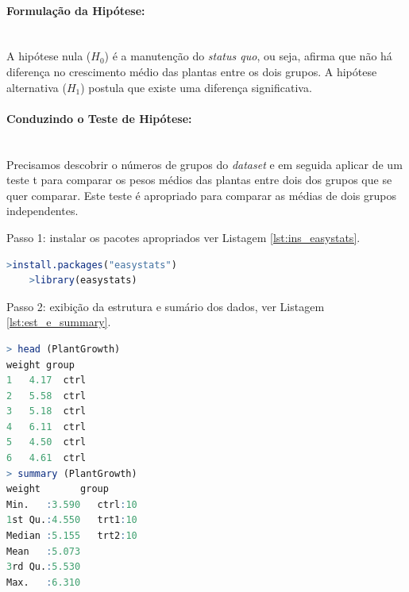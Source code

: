 \documentclass[article]{memoir}
\newcommand{\rlogo}{\protect\texttt{[image: figs/r\_logo.png]}}
\begin{document}
\paragraph*{Formulação da Hipótese:}\mbox{}\\

A hipótese nula ($H_0$) é a manutenção do \textit{status quo}, ou seja,  afirma que não há diferença no crescimento médio das plantas entre os dois grupos. A hipótese alternativa ($H_1$) postula que existe uma diferença significativa.

\paragraph*{Conduzindo o Teste de Hipótese:}\mbox{}\\
Precisamos descobrir o números de grupos do \textit{dataset} e em seguida aplicar de um teste t para comparar os pesos médios das plantas entre dois dos grupos que se quer comparar. Este teste é apropriado para comparar as médias de dois grupos independentes.

Passo 1: instalar os pacotes apropriados ver Listagem \ref{lst:ins_easystats}.

\begin{lstlisting}[language={R}, caption={comando para instalar e carregar a bibliotrca easystat.}, label={lst:ins_easystats}]
	>install.packages("easystats")
	>library(easystats)
\end{lstlisting}

%

Passo 2: exibição da estrutura e sumário dos dados, ver Listagem \ref{lst:est_e_summary}.

\begin{lstlisting}[language={R}, caption={comando para exibição  da estrutura e sumário do \textit{dataframe} no \rlogo.}, label={lst:est_e_summary}]
> head (PlantGrowth)
weight group
1   4.17  ctrl
2   5.58  ctrl
3   5.18  ctrl
4   6.11  ctrl
5   4.50  ctrl
6   4.61  ctrl
> summary (PlantGrowth)
weight       group   
Min.   :3.590   ctrl:10  
1st Qu.:4.550   trt1:10  
Median :5.155   trt2:10  
Mean   :5.073            
3rd Qu.:5.530            
Max.   :6.310            
\end{lstlisting}
\end{document}
